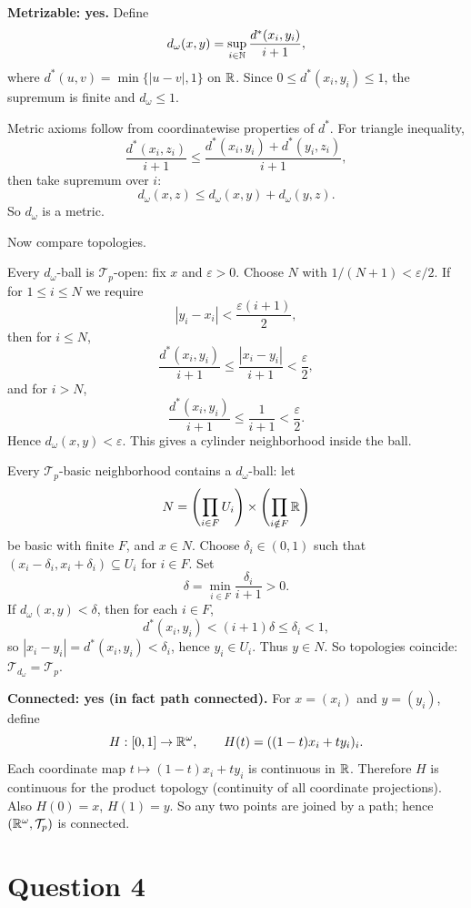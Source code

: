 \documentclass{article}
\begin{document}
\begin{solution}
  \textbf{Metrizable: yes.}
  Define
  \[
    d_\omega(x,y)=\sup_{i\in\mathbb{N}}\frac{d^*(x_i,y_i)}{i+1},
  \]
  where $d^*(u,v)=\min\{|u-v|,1\}$ on $\mathbb{R}$.
  Since $0\le d^*(x_i,y_i)\le 1$, the supremum is finite and $d_\omega\le 1$.

  Metric axioms follow from coordinatewise properties of $d^*$.
  For triangle inequality,
  \[
    \frac{d^*(x_i,z_i)}{i+1}
    \le \frac{d^*(x_i,y_i)+d^*(y_i,z_i)}{i+1},
  \]
  then take supremum over $i$:
  \[
    d_\omega(x,z)\le d_\omega(x,y)+d_\omega(y,z).
  \]
  So $d_\omega$ is a metric.

  Now compare topologies.

  Every $d_\omega$-ball is $\mathcal{T}_p$-open:
  fix $x$ and $\varepsilon>0$. Choose $N$ with $1/(N+1)<\varepsilon/2$.
  If for $1\le i\le N$ we require
  \[
    |y_i-x_i|<\frac{\varepsilon(i+1)}{2},
  \]
  then for $i\le N$,
  \[
    \frac{d^*(x_i,y_i)}{i+1}\le \frac{|x_i-y_i|}{i+1}<\frac\varepsilon2,
  \]
  and for $i>N$,
  \[
    \frac{d^*(x_i,y_i)}{i+1}\le \frac{1}{i+1}<\frac\varepsilon2.
  \]
  Hence $d_\omega(x,y)<\varepsilon$. This gives a cylinder
  neighborhood inside the ball.

  Every $\mathcal{T}_p$-basic neighborhood contains a $d_\omega$-ball:
  let
  \[
    N=\left(\prod_{i\in F}U_i\right)\times\left(\prod_{i\notin F}\mathbb{R}\right)
  \]
  be basic with finite $F$, and $x\in N$.
  Choose $\delta_i\in(0,1)$ such that
  $(x_i-\delta_i,x_i+\delta_i)\subseteq U_i$ for $i\in F$.
  Set
  \[
    \delta=\min_{i\in F}\frac{\delta_i}{i+1}>0.
  \]
  If $d_\omega(x,y)<\delta$, then for each $i\in F$,
  \[
    d^*(x_i,y_i)<(i+1)\delta\le \delta_i<1,
  \]
  so $|x_i-y_i|=d^*(x_i,y_i)<\delta_i$, hence $y_i\in U_i$.
  Thus $y\in N$.
  So topologies coincide: $\mathcal{T}_{d_\omega}=\mathcal{T}_p$.

  \textbf{Connected: yes (in fact path connected).}
  For $x=(x_i)$ and $y=(y_i)$, define
  \[
    H:[0,1]\to\mathbb{R}^\omega,\qquad H(t)=((1-t)x_i+ty_i)_i.
  \]
  Each coordinate map $t\mapsto (1-t)x_i+ty_i$ is continuous in $\mathbb{R}$.
  Therefore $H$ is continuous for the product topology (continuity of
  all coordinate projections).
  Also $H(0)=x$, $H(1)=y$.
  So any two points are joined by a path; hence $(\mathbb{R}^\omega,\mathcal{T}_p)$ is connected.
\end{solution}

\section{Question 4}
\end{document}
